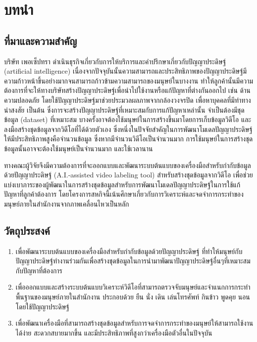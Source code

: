\chapter{บทนำ}
\section{ที่มาและความสำคัญ}
บริษัท เพอเซ็ปทรา ดำเนินธุรกิจเกี่ยวกับการให้บริการและคำปรึกษาเกี่ยวกับปัญญาประดิษฐ์ (artificial intelligence)
เนื่องจากปัจจุบันนั้นความสามารถและประสิทธิภาพของปัญญาประดิษฐ์มีความก้าวหน้าขึ้นอย่างมากจนสามารถก้าวข้ามความสามารถของมนุษย์ในบางงาน
ทำให้ลูกค้านั้นมีความต้องการที่จะให้ทางบริษัทสร้างปัญญาประดิษฐ์เพื่อนำไปใช้งานหรือแก้ปัญหาที่ต่างกันออกไป เช่น ด้านความปลอดภัย 
โดยใช้ปัญญาประดิษฐ์มาช่วยประมวลผลภาพจากกล้องวงจรปิด เพื่อหาบุคคลที่มีท่าทางน่าสงสัย เป็นต้น
ซึ่งการจะสร้างปัญญาประดิษฐ์ที่เหมาะสมกับการแก้ปัญหาเหล่านั้น จำเป็นต้องมีชุดข้อมูล (dataset) ที่เหมาะสม บางครั้งอาจต้องใช้มนุษย์ในการสร้างขึ้นมาโดยการเก็บข้อมูลวิดีโอ 
และลงมือสร้างชุดข้อมูลจากวิดีโอที่ได้ด้วยตัวเอง ซึ่งหนึ่งในปัจจัยสำคัญในการพัฒนาโมเดลปัญญาประดิษฐ์ให้มีประสิทธิภาพสูงคือจำนวนข้อมูล
ซึ่งหากมีจำนวนวิดีโอเป็นจำนวนมาก การใช้มนุษย์ในการสร้างชุดข้อมูลนั้นอาจจะต้องใช้มนุษย์เป็นจำนวนมาก และใช้เวลานาน 

ทางคณะผู้วิจัยจึงมีความต้องการที่จะออกแบบและพัฒนาระบบต้นแบบของเครื่องมือสำหรับกำกับข้อมูลด้วยปัญญาประดิษฐ์ (A.I.-assisted video labeling tool) สำหรับสร้างชุดข้อมูลจากวิดีโอ 
เพื่อช่วยแบ่งเบาภาระของผู้พัฒนาในการสร้างชุดข้อมูลสำหรับการพัฒนาโมเดลปัญญาประดิษฐ์ในการใช้แก้ปัญหาที่ลูกค้าต้องการ 
โดยโครงการสหกิจนี้เน้นศึกษาเกี่ยวกับการวิเคราะห์และจดจำการกระทำของมนุษย์ภายในสำนักงานจากภาพเคลื่อนไหวเป็นหลัก

\section{วัตถุประสงค์}
\begin{enumerate}
	\setlength\itemsep{-0.25em}
	\item เพื่อพัฒนาระบบต้นแบบของเครื่องมือสำหรับกำกับข้อมูลด้วยปัญญาประดิษฐ์ ที่ทำให้มนุษย์กับปัญญาประดิษฐ์ทำงานร่วมกันเพื่อสร้างชุดข้อมูลในการนำมาพัฒนาปัญญาประดิษฐ์อื่นๆที่เหมาะสมกับปัญหาที่ต้องการ
	\item เพื่อออกแบบและสร้างระบบต้นแบบวิเคราะห์วิดีโอที่สามารถตรวจจับมนุษย์และจำแนกการกระทำพื้นฐานของมนุษย์ภายในสำนักงาน ประกอบด้วย ยืน นั่ง เดิน เล่นโทรศัพท์ กินข้าว พูดคุย นอน โดยใช้ปัญญาประดิษฐ์
	\item เพื่อพัฒนาเครื่องมือที่สามารถสร้างชุดข้อมูลสำหรับการจดจำการกระทำของมนุษย์ให้สามารถใช้งานได้ง่าย สะดวกสบายมากขึ้น และมีประสิทธิภาพที่สูงกว่าเครื่องมือตัวอื่นในปัจจุบัน
\end{enumerate}

